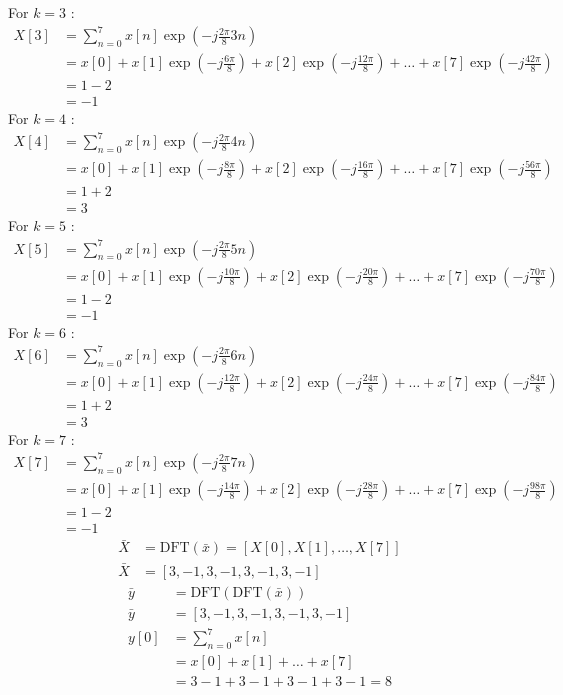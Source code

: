 \documentclass[journal,12pt,onecolumn]{IEEEtran}
\theoremstyle{remark}
\begin{document}
    For $k=3$ :
    \begin{align}
    X[3] &= \sum_{n=0}^{7}x[n]\exp\left(-j\frac{2\pi}{8}3n\right)\\
    &= x[0] + x[1]\exp\left(-j\frac{6\pi}{8}\right) + x[2]\exp\left(-j\frac{12\pi}{8}\right) + \dots + x[7]\exp\left(-j\frac{42\pi}{8}\right)\\
    &= 1 - 2  \\
    &= -1
    \end{align}
    For $k=4$ :
    \begin{align}
    X[4] &= \sum_{n=0}^{7}x[n]\exp\left(-j\frac{2\pi}{8}4n\right)\\
    &= x[0] + x[1]\exp\left(-j\frac{8\pi}{8}\right) + x[2]\exp\left(-j\frac{16\pi}{8}\right) + \dots + x[7]\exp\left(-j\frac{56\pi}{8}\right)\\
    &= 1 + 2  \\
    &= 3
    \end{align}
    For $k=5$ :
    \begin{align}
    X[5] &= \sum_{n=0}^{7}x[n]\exp\left(-j\frac{2\pi}{8}5n\right)\\
    &= x[0] + x[1]\exp\left(-j\frac{10\pi}{8}\right) + x[2]\exp\left(-j\frac{20\pi}{8}\right) + \dots + x[7]\exp\left(-j\frac{70\pi}{8}\right)\\
    &= 1 - 2  \\
    &= -1
    \end{align}
    For $k=6$ :
    \begin{align}
    X[6] &= \sum_{n=0}^{7}x[n]\exp\left(-j\frac{2\pi}{8}6n\right)\\
    &= x[0] + x[1]\exp\left(-j\frac{12\pi}{8}\right) + x[2]\exp\left(-j\frac{24\pi}{8}\right) + \dots + x[7]\exp\left(-j\frac{84\pi}{8}\right)\\
    &= 1 + 2  \\
    &= 3
    \end{align}
    For $k=7$ :
    \begin{align}
    X[7] &= \sum_{n=0}^{7}x[n]\exp\left(-j\frac{2\pi}{8}7n\right)\\
    &= x[0] + x[1]\exp\left(-j\frac{14\pi}{8}\right) + x[2]\exp\left(-j\frac{28\pi}{8}\right) + \dots + x[7]\exp\left(-j\frac{98\pi}{8}\right)\\
    &= 1 - 2  \\
    &= -1
    \end{align}
    \begin{align}
    \bar{X} &= \text{DFT}(\bar{x}) = [X[0],X[1],\dots,X[7]]\\
    \bar{X} &= [3,-1,3,-1,3,-1,3,-1]
    \end{align}
    \begin{align}
    \bar{y} &= \text{DFT}(\text{DFT}(\bar{x}))\\
    \bar{y} &= [3,-1,3,-1,3,-1,3,-1]\\
    y[0] &= \sum_{n=0}^{7}x[n]\\
    &= x[0] + x[1] + \dots + x[7]\\
    &= 3 -1 +3 -1 +3 -1 +3 -1 = 8
    \end{align}
\end{document}
